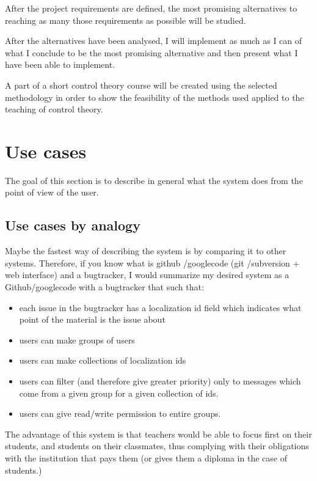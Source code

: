 \documentclass[12pt]{article}
\begin{document}
After the project requirements are defined, the most promising alternatives to reaching as many those requirements as possible will be studied.

After the alternatives have been analysed, I will implement as much as I can of what I conclude to be the most promising alternative and then present what I have been able to implement.

A part of a short control theory course will be created using the selected methodology in order to show the feasibility of the methods used applied to the teaching of control theory.

\section{Use cases} \label{use-cases}

The goal of this section is to describe in general what the system does from the point of view of the user.

\subsection{Use cases by analogy} \label{use-cases-analogy}

Maybe the fastest way of describing the system is by comparing it to other systems. Therefore, if you know what is github \cite{Gi12}/googlecode\cite{Go12} (git \cite{git}/subversion  + web interface) and a bugtracker, I would summarize my desired system as a Github/googlecode with a bugtracker that such that:

\begin{itemize}
  \item each issue in the bugtracker has a localization id field which indicates what point of the material is the issue about
  \item users can make groups of users
  \item users can make collections of localization ids
  \item users can filter (and therefore give greater priority) only to messages which come from a given group for a given collection of ids.
  \item users can give read/write permission to entire groups.
\end{itemize}

The advantage of this system is that teachers would be able to focus first on their students, and students on their classmates, thus complying with their obligations with the institution that pays them (or gives them a diploma in the case of students.)
\end{document}

